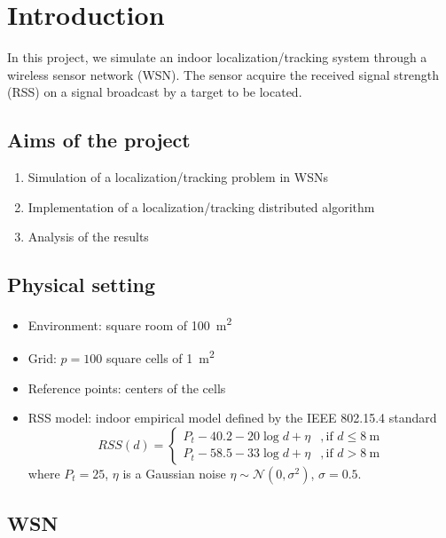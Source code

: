 \section{Introduction}
In this project, we simulate an indoor localization/tracking system through a wireless sensor network (WSN).
The sensor acquire the received signal strength (RSS) on a signal broadcast by a target to be located.

\subsection{Aims of the project}

\begin{enumerate}
    \item Simulation of a localization/tracking problem in WSNs
    \item Implementation of a localization/tracking distributed algorithm
    \item Analysis of the results
\end{enumerate}

\subsection{Physical setting}

\begin{itemize}
    \item Environment: square room of \SI{100}{\metre\squared}
    \item Grid: $p = 100$ square cells of \SI{1}{\metre\squared}
    \item Reference points: centers of the cells
    \item RSS model: indoor empirical model defined by the IEEE 802.15.4 standard
        \begin{equation}
            RSS(d) = \begin{cases}
                P_t - 40.2 - 20\log{d} + \eta & , \text{if $d\leq \SI{8}{\metre}$}\\
                P_t - 58.5 - 33\log{d} + \eta & , \text{if $d > \SI{8}{\metre}$}
            \end{cases}
        \end{equation}
        where $P_t=25$, $\eta$ is a Gaussian noise $\eta \sim \mathcal{N}(0,\sigma^2)$, $\sigma = 0.5$.
\end{itemize}

\subsection{WSN}

